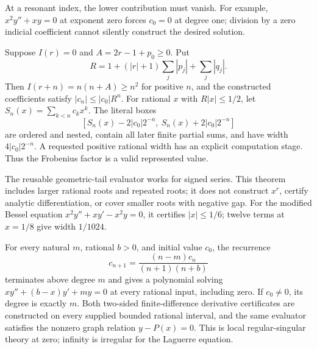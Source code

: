 At a resonant index, the lower contribution must vanish. For example,
$x^2y''+xy=0$ at exponent zero forces $c_0=0$ at degree one; division by a
zero indicial coefficient cannot silently construct the desired solution.
\leanok

\begin{theorem}
\label{thm:frobenius-convergence}
Suppose $I(r)=0$ and $A=2r-1+p_0\ge0$. Put
\[
 R=1+(|r|+1)\sum_j|p_j|+\sum_j|q_j|.
\]
Then $I(r+n)=n(n+A)\ge n^2$ for positive $n$, and the constructed
coefficients satisfy $|c_n|\le |c_0|R^n$. For rational $x$ with
$R|x|\le 1/2$, let $S_n(x)=\sum_{k<n}c_kx^k$. The literal boxes
\[
 [S_n(x)-2|c_0|2^{-n},\ S_n(x)+2|c_0|2^{-n}]
\]
are ordered and nested, contain all later finite partial sums, and have
width $4|c_0|2^{-n}$. A requested positive rational width has an explicit
computation stage. Thus the Frobenius factor is a valid represented value.
\leanok
\end{theorem}

The reusable geometric-tail evaluator works for signed series. This theorem
includes larger rational roots and repeated roots; it does not construct
$x^r$, certify analytic differentiation, or cover smaller roots with negative
gap. For the modified Bessel equation $x^2y''+xy'-x^2y=0$, it certifies
$|x|\le1/6$; twelve terms at $x=1/8$ give width $1/1024$.

\begin{theorem}
\label{thm:laguerre-polynomial}
For every natural $m$, rational $b>0$, and initial value $c_0$, the recurrence
\[
 c_{n+1}=\frac{(n-m)c_n}{(n+1)(n+b)}
\]
terminates above degree $m$ and gives a polynomial solving
$xy''+(b-x)y'+my=0$ at every rational input, including zero.
If $c_0\ne0$, its degree is exactly $m$. Both two-sided finite-difference
derivative certificates are constructed on every supplied bounded rational
interval, and the same evaluator satisfies the nonzero graph relation
$y-P(x)=0$. This is local regular-singular theory at zero; infinity is
irregular for the Laguerre equation.
\leanok
\end{theorem}

